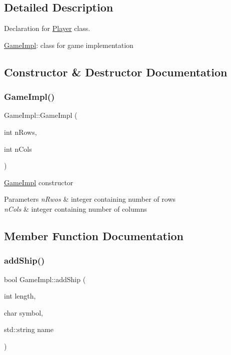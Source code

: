 \subsection{Detailed Description}
Declaration for \mbox{\hyperlink{class_player}{Player}} class. 

\mbox{\hyperlink{class_game_impl}{Game\+Impl}}\+: class for game implementation 

\subsection{Constructor \& Destructor Documentation}
\mbox{\label{class_game_impl_a1ec88dfb57e180ee008cff4cf10934bf}} 
\subsubsection{\texorpdfstring{Game\+Impl()}{GameImpl()}}
{\footnotesize\ttfamily Game\+Impl\+::\+Game\+Impl (\begin{DoxyParamCaption}\item[{int}]{n\+Rows,  }\item[{int}]{n\+Cols }\end{DoxyParamCaption})}

\mbox{\hyperlink{class_game_impl}{Game\+Impl}} constructor 
\begin{DoxyParams}{Parameters}
{\em n\+Rwos} & integer containing number of rows \\
\hline
{\em n\+Cols} & integer containing number of columns \\
\hline
\end{DoxyParams}


\subsection{Member Function Documentation}
\mbox{\label{class_game_impl_a181c0a610e9d11739dd1a96a73703103}} 
\subsubsection{\texorpdfstring{add\+Ship()}{addShip()}}
{\footnotesize\ttfamily bool Game\+Impl\+::add\+Ship (\begin{DoxyParamCaption}\item[{int}]{length,  }\item[{char}]{symbol,  }\item[{std\+::string}]{name }\end{DoxyParamCaption})}

